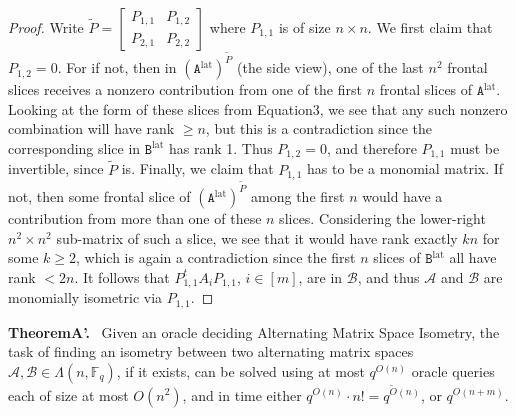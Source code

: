 \documentclass[10pt,a4paper]{article}
\newenvironment{authorclaim}[1]{\par\medskip\noindent\textbf{#1.}\ }{\par\medskip}
\begin{document}
\begin{proof}
Write $\widetilde P=\begin{bmatrix}P_{1,1}&P_{1,2}\\P_{2,1}&P_{2,2}\end{bmatrix}$ where $P_{1,1}$ is of size $n\times n$. We first claim that $P_{1,2}=0$. For if not, then in $(\mathtt A^{\mathrm{lat}})^{\widetilde P}$ (the side view), one of the last $n^2$ frontal slices receives a nonzero contribution from one of the first $n$ frontal slices of $\mathtt A^{\mathrm{lat}}$. Looking at the form of these slices from Equation3, we see that any such nonzero combination will have rank $\ge n$, but this is a contradiction since the corresponding slice in $\mathtt B^{\mathrm{lat}}$ has rank 1. Thus $P_{1,2}=0$, and therefore $P_{1,1}$ must be invertible, since $\widetilde P$ is.
Finally, we claim that $P_{1,1}$ has to be a monomial matrix. If not, then some frontal slice of $(\mathtt A^{\mathrm{lat}})^{\widetilde P}$ among the first $n$ would have a contribution from more than one of these $n$ slices. Considering the lower-right $n^2\times n^2$ sub-matrix of such a slice, we see that it would have rank exactly $kn$ for some $k\ge2$, which is again a contradiction since the first $n$ slices of $\mathtt B^{\mathrm{lat}}$ all have rank $<2n$. It follows that $P_{1,1}^tA_iP_{1,1}$, $i\in[m]$, are in $\mathcal B$, and thus $\mathcal A$ and $\mathcal B$ are monomially isometric via $P_{1,1}$.
\end{proof}

\begin{authorclaim}{TheoremA'}
Given an oracle deciding Alternating Matrix Space Isometry, the task of finding an isometry between two alternating matrix spaces $\mathcal A,\mathcal B\in\Lambda(n,\mathbb F_q)$, if it exists, can be solved using at most $q^{O(n)}$ oracle queries each of size at most $O(n^2)$, and in time either $q^{O(n)}\cdot n!=q^{\widetilde O(n)}$, or $q^{O(n+m)}$.
\end{authorclaim}
\end{document}
